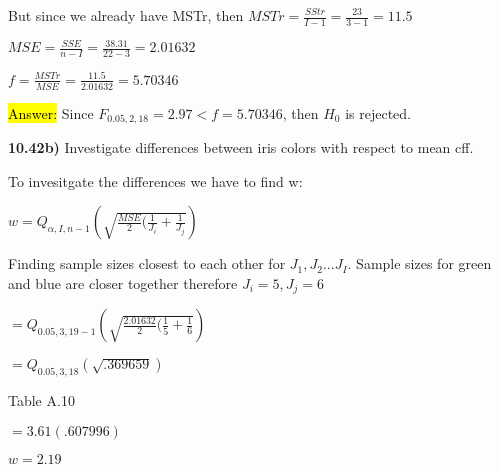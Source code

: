 \documentclass{article}
\begin{document}
\vspace{2mm}

But since we already have MSTr, then $MSTr=\frac{SStr}{I-1}=\frac{23}{3-1}=11.5$

\vspace{2mm}

$MSE=\frac{SSE}{n-I}=\frac{38.31}{22-3}=2.01632$

\vspace{2mm}


$f=\frac{MSTr}{MSE}=\frac{11.5}{2.01632}=5.70346$

\vspace{2mm}

\hl{Answer:} Since $F_{0.05, 2, 18}=2.97 < f=5.70346$, then $H_{0}$ is rejected.



\vspace{5mm}
 
 
 
\textbf{10.42b)} Investigate differences between iris colors with respect to mean cff.

\vspace{2mm}

To invesitgate the differences we have to find w:

\vspace{2mm}

$w=Q_{\alpha, I, n-1} (\sqrt{\frac{MSE}{2}(\frac{1}{J_{i}}+\frac{1}{J_{j}}})$

\vspace{2mm}

Finding sample sizes closest to each other for $J_{1},J_{2}...J_{I}$. Sample sizes for green and blue 
are closer together therefore $J_{i}=5, J_{j}=6$

\vspace{2mm}

$=Q_{0.05, 3, 19-1} (\sqrt{\frac{2.01632}{2}(\frac{1}{5}+\frac{1}{6}})$

\vspace{2mm}

$=Q_{0.05, 3, 18}(\sqrt{.369659})$

\vspace{2mm}

Table A.10

\vspace{2mm}

$=3.61(.607996)$

\vspace{2mm}

$w=2.19$
\end{document}
